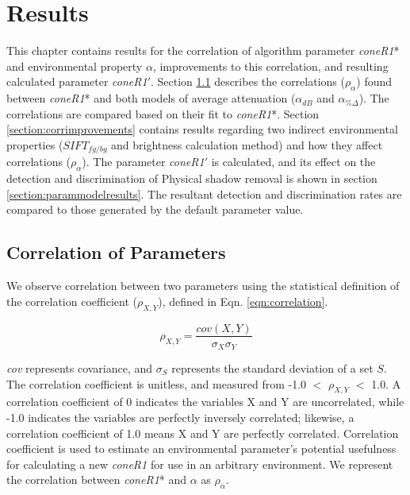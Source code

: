 \clearpage
\chapter{Results}

This chapter contains results for the correlation of algorithm parameter \textit{coneR1}* and environmental property $\alpha$, improvements to this correlation, and resulting calculated parameter \textit{coneR1}$'$. Section \ref{section:corrofparams} describes the correlations ($\rho_{\alpha}$) found between \textit{coneR1}* and both models of average attenuation ($\alpha_{dB}$ and $\alpha_{\%\Delta}$). The correlations are compared based on their fit to \textit{coneR1}*. Section \ref{section:corrimprovements} contains results regarding two indirect environmental properties ($SIFT_{fg/bg}$ and brightness calculation method) and how they affect correlations ($\rho_{\alpha}$). The parameter \textit{coneR1}$'$ is calculated, and its effect on the detection and discrimination of Physical shadow removal is shown in section \ref{section:parammodelresults}. The resultant detection and discrimination rates are compared to those generated by the default parameter value.

\section{Correlation of Parameters} \label{section:corrofparams}

We observe correlation between two parameters using the statistical definition of the correlation coefficient ($\rho_{X,Y}$), defined in Eqn. \ref{eqn:correlation}.

\begin{equation}
\rho_{X,Y} = \dfrac{cov(X,Y)}{\sigma_X\sigma_Y}
\label{eqn:correlation}
\end{equation}

\textit{cov} represents covariance, and $\sigma_{S}$ represents the standard deviation of a set $S$. The correlation coefficient is unitless, and measured from -1.0 $<$ $\rho_{X,Y}$ $<$ 1.0. A correlation coefficient of 0 indicates the variables X and Y are uncorrelated, while -1.0 indicates the variables are perfectly inversely correlated; likewise, a correlation coefficient of 1.0 means X and Y are perfectly correlated. Correlation coefficient is used to estimate an environmental parameter's potential usefulness for calculating a new \textit{coneR1} for use in an arbitrary environment. We represent the correlation between \textit{coneR1}* and $\alpha$ as $\rho_{\alpha}$.


